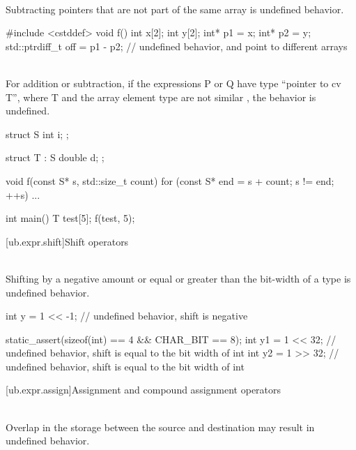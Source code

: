 \pnum
{} \\
Subtracting pointers that are not part of the same array is undefined behavior.

\pnum
\begin{example}
\begin{codeblock}
#include <cstddef>
void f() {
  int x[2];
  int y[2];
  int* p1 = x;
  int* p2 = y;
  std::ptrdiff_t off = p1 - p2; // undefined behavior,  and  point to different arrays
}
\end{codeblock}
\end{example}

\pnum
{} \\
For addition or subtraction, if the expressions P or Q have type ``pointer to cv T'', where T and the array
element type are not similar , the behavior is undefined.

\pnum
\begin{example}
\begin{codeblock}
struct S {
  int i;
};

struct T : S {
  double d;
};

void f(const S* s, std::size_t count) {
  for (const S* end = s + count; s != end; ++s) {
    ...
  }
}

int main() {
  T test[5];
  f(test, 5);
}
\end{codeblock}
\end{example}


[ub.expr.shift]{Shift operators}

\pnum
{} \\
Shifting by a negative amount or equal or greater than the bit-width of a type is undefined behavior.

\pnum
\begin{example}
\begin{codeblock}
int y = 1 << -1;        // undefined behavior, shift is negative

static_assert(sizeof(int) == 4 && CHAR_BIT == 8);
int y1 = 1 << 32;       // undefined behavior, shift is equal to the bit width of int
int y2 = 1 >> 32;       // undefined behavior, shift is equal to the bit width of int
\end{codeblock}
\end{example}


[ub.expr.assign]{Assignment and compound assignment operators}

\pnum
{} \\
Overlap in the storage between the source and destination may result in undefined behavior.

